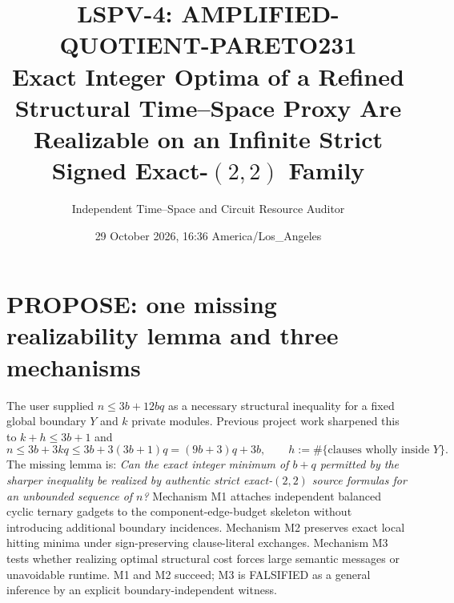 \documentclass[10.5pt]{article}
\title{LSPV-4: AMPLIFIED-QUOTIENT-PARETO231\\[2pt]
\large Exact Integer Optima of a Refined Structural Time--Space Proxy Are Realizable on an Infinite Strict Signed Exact-$(2,2)$ Family}
\author{Independent Time--Space and Circuit Resource Auditor}
\date{29 October 2026, 16:36 America/Los\_Angeles}
\begin{document}
\maketitle
\begin{center}
\end{center}

\section{PROPOSE: one missing realizability lemma and three mechanisms}
The user supplied $n\le3b+12bq$ as a necessary structural inequality for a fixed global boundary $Y$ and $k$ private modules. Previous project work \cite{burden,component} sharpened this to $k+h\le3b+1$ and
\begin{equation}\label{eq:sharp}
 n\le3b+3kq\le3b+3(3b+1)q=(9b+3)q+3b,
 \qquad h:=\#\{\text{clauses wholly inside }Y\}.
\end{equation}
The missing lemma is: \emph{Can the exact integer minimum of $b+q$ permitted by the sharper inequality be realized by authentic strict exact-$(2,2)$ source formulas for an unbounded sequence of $n$?} Mechanism M1 attaches independent balanced cyclic ternary gadgets to the component-edge-budget skeleton without introducing additional boundary incidences. Mechanism M2 preserves exact local hitting minima under sign-preserving clause-literal exchanges. Mechanism M3 tests whether realizing optimal structural cost forces large semantic messages or unavoidable runtime. M1 and M2 succeed; M3 is FALSIFIED as a general inference by an explicit boundary-independent witness.
\end{document}
